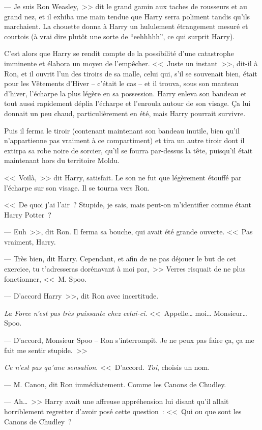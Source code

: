 --- Je suis Ron Weasley,~>> dit le grand gamin aux taches de rousseurs et au grand nez, et il exhiba une main tendue que Harry serra poliment tandis qu'ils marchaient. La chouette donna à Harry un hululement étrangement mesuré et courtois (à vrai dire plutôt une sorte de “eehhhhh”, ce qui surprit Harry).

C'est alors que Harry se rendit compte de la possibilité d'une catastrophe imminente et élabora un moyen de l'empêcher. <<~Juste un instant~>>, dit-il à Ron, et il ouvrit l'un des tiroirs de sa malle, celui qui, s'il se souvenait bien, était pour les Vêtements d'Hiver -- c'était le cas -- et il trouva, sous son manteau d'hiver, l'écharpe la plus légère en sa possession. Harry enleva son bandeau et tout aussi rapidement déplia l'écharpe et l'enroula autour de son visage. Ça lui donnait un peu chaud, particulièrement en été, mais Harry pourrait survivre.

Puis il ferma le tiroir (contenant maintenant son bandeau inutile, bien qu'il n'appartienne pas vraiment à ce compartiment) et tira un autre tiroir dont il extirpa sa robe noire de sorcier, qu'il se fourra par-dessus la tête, puisqu'il était maintenant hors du territoire Moldu.

<<~Voilà,~>> dit Harry, satisfait. Le son ne fut que légèrement étouffé par l'écharpe sur son visage. Il se tourna vers Ron.

<<~De quoi j'ai l'air~? Stupide, je sais, mais peut-on m'identifier comme étant Harry Potter~?

--- Euh~>>, dit Ron. Il ferma sa bouche, qui avait été grande ouverte. <<~Pas vraiment, Harry.

--- Très bien, dit Harry. Cependant, et afin de ne pas déjouer le but de cet exercice, tu t'adresseras dorénavant à moi par,~>> Verres risquait de ne plus fonctionner, <<~M. Spoo.

--- D'accord Harry~>>, dit Ron avec incertitude.

\emph{La Force n'est pas très puissante chez celui-ci}. <<~Appelle… moi… Monsieur… Spoo.

--- D'accord, Monsieur Spoo -- Ron s'interrompit. Je ne peux pas faire ça, ça me fait me sentir stupide.~>>

\emph{Ce n'est pas qu'une sensation}. <<~D'accord. \emph{Toi}, choisis un nom.

--- M. Canon, dit Ron immédiatement. Comme les Canons de Chudley.

--- Ah…~>> Harry avait une affreuse appréhension lui disant qu'il allait horriblement regretter d'avoir posé cette question~: <<~Qui ou que sont les Canons de Chudley~?

